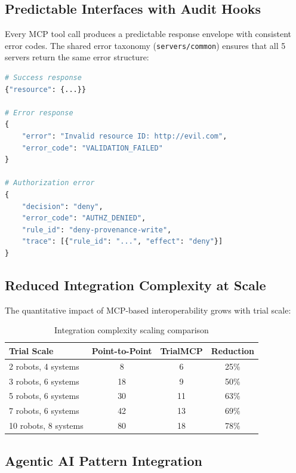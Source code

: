 \documentclass[10pt,letterpaper]{article}
\begin{document}
\subsection{Predictable Interfaces with Audit Hooks}

Every MCP tool call produces a predictable response envelope with consistent error codes. The shared error taxonomy (\texttt{servers/common}) ensures that all 5 servers return the same error structure:

\begin{lstlisting}[language=Python,title={\textbf{Standardized Error Response (v0.2.0)}}]
# Success response
{"resource": {...}}

# Error response
{
    "error": "Invalid resource ID: http://evil.com",
    "error_code": "VALIDATION_FAILED"
}

# Authorization error
{
    "decision": "deny",
    "error_code": "AUTHZ_DENIED",
    "rule_id": "deny-provenance-write",
    "trace": [{"rule_id": "...", "effect": "deny"}]
}
\end{lstlisting}

\subsection{Reduced Integration Complexity at Scale}

The quantitative impact of MCP-based interoperability grows with trial scale:

\begin{table}[H]
\centering
\caption{Integration complexity scaling comparison}
\label{tab:scaling}
\small
\begin{tabularx}{\textwidth}{l c c c}
\toprule
\textbf{Trial Scale} & \textbf{Point-to-Point} & \textbf{TrialMCP} & \textbf{Reduction} \\
\midrule
2 robots, 4 systems & 8 & 6 & 25\% \\
3 robots, 6 systems & 18 & 9 & 50\% \\
5 robots, 6 systems & 30 & 11 & 63\% \\
7 robots, 6 systems & 42 & 13 & 69\% \\
10 robots, 8 systems & 80 & 18 & 78\% \\
\bottomrule
\end{tabularx}
\end{table}

\subsection{Agentic AI Pattern Integration}
\end{document}
